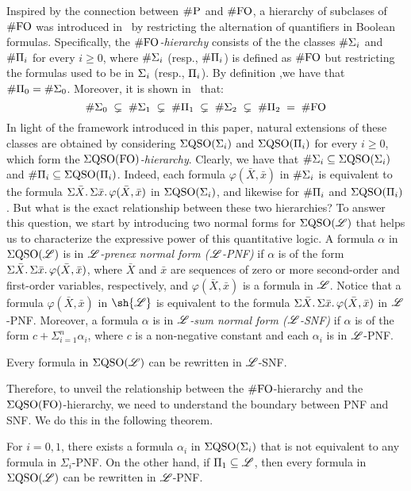 
Inspired by the connection between $\text{\sc \#P}$ and $\#{\rm FO}$, a hierarchy of subclases of $\#{\rm FO}$ was introduced in~\cite{SalujaST95} 
by restricting the alternation of quantifiers in Boolean formulas.
Specifically, the \emph{$\#{\rm FO}$-hierarchy} consists of the 
the classes $\#\Sigma_{i}$ and $\#\Pi_{i}$ for every $i \geq 0$, where $\#\Sigma_{i}$ (resp., $\#\Pi_{i}$) is defined as $\#{\rm FO}$ but restricting the formulas used to be in $\Sigma_{i}$ (resp., $\Pi_{i}$).
By definition ,we have that $\#\Pi_{0} = \#\Sigma_{0}$. Moreover, it is shown in~\cite{SalujaST95} that:
\[
\#\Sigma_{0} \; \subsetneq \; \#\Sigma_{1} \; \subsetneq \; \#\Pi_{1} \; \subsetneq \; \#\Sigma_{2} \; \subsetneq \; \#\Pi_{2} \; = \; \#{\rm FO} 
\]
In light of the framework introduced in this paper, natural extensions of these classes are obtained by considering 
$\Sigma{\rm QSO}(\Sigma_{i})$ and $\Sigma{\rm QSO}(\Pi_{i})$ for every $i \geq 0$, which form the \emph{$\Sigma{\rm QSO}({\rm FO})$-hierarchy}.
Clearly, we have that $\#\Sigma_{i} \subseteq \Sigma{\rm QSO}(\Sigma_{i})$ and $\#\Pi_{i} \subseteq \Sigma{\rm QSO}(\Pi_{i})$. Indeed, each formula $\varphi(\bar{X}, \bar{x})$ in $\#\Sigma_{i}$ is equivalent to the formula $\Sigma{\bar X}.\, \Sigma{\bar x}.\, \varphi(\bar{X}, \bar{x})$ in $\Sigma{\rm QSO}(\Sigma_{i})$, and likewise for $\#\Pi_{i}$ and $\Sigma{\rm QSO}(\Pi_{i})$.
But what is the exact relationship between these two hierarchies?
To answer this question, we start by introducing two normal forms for $\Sigma{\rm QSO}(\mathscr{L})$ that helps us to characterize the expressive power of this quantitative logic.
A formula $\alpha$ in $\Sigma{\rm QSO}(\mathscr{L})$ is in \emph{$\mathscr{L}$-prenex normal form ($\mathscr{L}$-PNF)} 
if $\alpha$ is of the form
$\Sigma{\bar{X}}.\, \Sigma{\bar{x}}.\, \varphi(\bar{X}, \bar{x})$,
where $\bar{X}$ and $\bar{x}$ are sequences of zero or more second-order and first-order variables, respectively, and $\varphi(\bar{X}, \bar{x})$ is a formula in $\mathscr{L}$. Notice that 
a formula $\varphi(\bar{X}, \bar{x})$ in $\sh{\LL}$ is equivalent to the formula $\Sigma{\bar X}.\, \Sigma{\bar x}.\, \varphi(\bar{X}, \bar{x})$ in $\mathscr{L}$-PNF. 
Moreover, a formula $\alpha$ is in \emph{$\mathscr{L}$-sum normal form ($\mathscr{L}$-SNF)} if $\alpha$ is of the form $c + \Sigma_{i=1}^n \alpha_i$, where $c$ is a non-negative constant and each $\alpha_i$ is in 
$\mathscr{L}$-PNF.
\begin{theorem}\label{theo-pnf-snf}
Every formula in $\Sigma{\rm QSO}(\mathscr{L})$ can be rewritten in $\mathscr{L}$-SNF.
\end{theorem}
Therefore, to unveil the relationship between the $\#{\rm FO}$-hierarchy and the $\Sigma{\rm QSO}({\rm FO})$-hierarchy, we need to understand the boundary between PNF and SNF. We do this in the following theorem. 
\begin{theorem}\label{theo-pi1-pnf}
For $i = 0,1$, there exists a formula $\alpha_i$ in $\Sigma{\rm QSO}(\Sigma_{i})$ that is not equivalent to any formula in $\Sigma_i$-PNF. 
On the other hand, if $\Pi_{1} \subseteq \mathscr{L}$, then 
	every formula in
	$\Sigma{\rm QSO}(\mathscr{L})$ can be rewritten in $\mathscr{L}$-PNF. 
\end{theorem}

